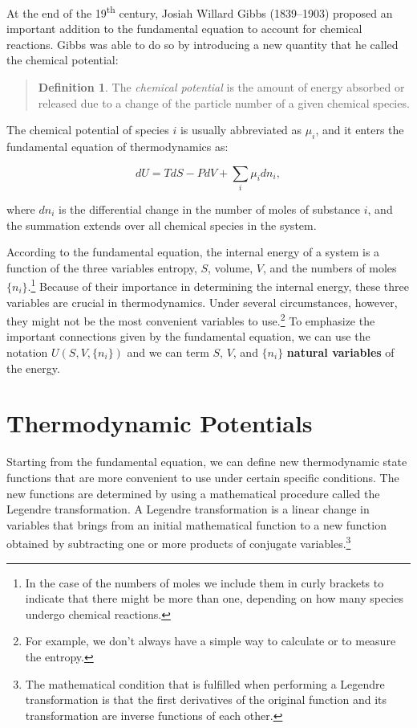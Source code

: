 \documentclass[
  9pt,
]{extbook}
\theoremstyle{definition}
\newtheorem{definition}{Definition}[chapter]
\theoremstyle{definition}
\theoremstyle{definition}
\theoremstyle{definition}
\theoremstyle{remark}
\begin{document}
At the end of the 19\textsuperscript{th} century, Josiah Willard Gibbs (1839--1903) proposed an important addition to the fundamental equation to account for chemical reactions. Gibbs was able to do so by introducing a new quantity that he called the chemical potential:

\begin{quote}
\begin{definition}
\protect\hypertarget{def:chemicalpot}{}\label{def:chemicalpot}The \emph{chemical potential} is the amount of energy absorbed or released due to a change of the particle number of a given chemical species.
\end{definition}
\end{quote}

The chemical potential of species \(i\) is usually abbreviated as \(\mu_i\), and it enters the fundamental equation of thermodynamics as:

\begin{equation}
dU = TdS-PdV+\sum_i\mu_i dn_i,
\label{eq:dunv2}
\end{equation}

where \(dn_i\) is the differential change in the number of moles of substance \(i\), and the summation extends over all chemical species in the system.

According to the fundamental equation, the internal energy of a system is a function of the three variables entropy, \(S\), volume, \(V\), and the numbers of moles \(\{n_i\}\).\footnote{In the case of the numbers of moles we include them in curly brackets to indicate that there might be more than one, depending on how many species undergo chemical reactions.} Because of their importance in determining the internal energy, these three variables are crucial in thermodynamics. Under several circumstances, however, they might not be the most convenient variables to use.\footnote{For example, we don't always have a simple way to calculate or to measure the entropy.} To emphasize the important connections given by the fundamental equation, we can use the notation \(U(S,V,\{n_i\})\) and we can term \(S\), \(V\), and \(\{n_i\}\) \textbf{natural variables} of the energy.

\section{Thermodynamic Potentials}\label{thermpot}

Starting from the fundamental equation, we can define new thermodynamic state functions that are more convenient to use under certain specific conditions. The new functions are determined by using a mathematical procedure called the Legendre transformation. A Legendre transformation is a linear change in variables that brings from an initial mathematical function to a new function obtained by subtracting one or more products of conjugate variables.\footnote{The mathematical condition that is fulfilled when performing a Legendre transformation is that the first derivatives of the original function and its transformation are inverse functions of each other.}
\end{document}
